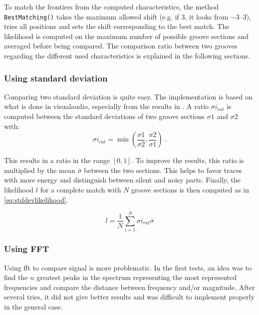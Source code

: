 To match the frontiers from the computed characteristics, the method \texttt{BestMatching()} takes the maximum allowed shift (e.g. if 3, it looks from \numrange{-3}{3}), tries all positions and sets the shift corresponding to the best match. The likelihood is computed on the maximum number of possible groove sections and averaged before being compared. The comparison ratio between two grooves regarding the different used characteristics is explained in the following sections.

\subsubsection{Using standard deviation}

Comparing two standard deviation is quite easy. The implementation is based on what is done in \gls{visualaudio}, especially from the results in \cite{benningerchunk12}. A ratio $\sigma i_{rat}$ is computed between the standard deviations of two groove sections $\sigma 1$ and $\sigma 2$ with:
\begin{equation}
\label{eq:stddevratio}
\sigma i_{rat} = \min\left(\frac{\sigma 1}{\sigma 2}, \frac{\sigma 2}{\sigma 1}\right) \; .
\end{equation}

This results in a ratio in the range $[0,1]$. To improve the results, this ratio is multiplied by the mean $\overline{\sigma}$ between the two sections. This helps to favor traces with more energy and distinguish between silent and noisy parts. Finally, the likelihood $l$ for a complete match with $N$ groove sections is then computed as in \eqref{eq:stddevlikelihood}.

\begin{equation}
\label{eq:stddevlikelihood}
l = \frac{1}{N} \sum_{i=1}^{N} \sigma i_{rat} \overline{\sigma}
\end{equation}

\subsubsection{Using FFT}

Using \gls{fft} to compare signal is more problematic. In the first tests, an idea was to find the $n$ greatest peaks in the spectrum representing the most represented frequencies and compare the distance between frequency and/or magnitude. After several tries, it did not give better results and was difficult to implement properly in the general case.

